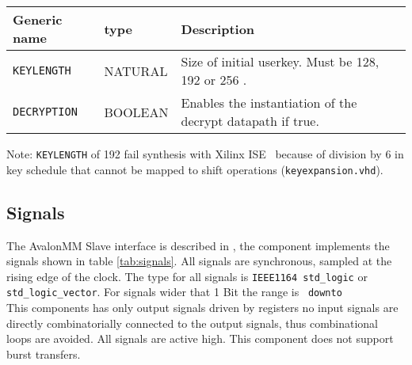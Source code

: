 \documentclass{ruschidoc}
\begin{document}
\begin{tabularx}{\textwidth}{|p{33mm}|p{25mm}|X|}
  \hline
  \bf{Generic name} & \bf{type} & \bf{Description}\\ \hline
  \texttt{KEYLENGTH}  \label{gen:keylength}	& NATURAL   & Size of initial userkey. Must be 128, 192 or 256 \footnotemark[1] . \\ \hline
  \texttt{DECRYPTION} \label{gen:decryption}  & BOOLEAN  & Enables the instantiation of the decrypt datapath if true. \\
\hline
\end{tabularx}
\label{tab:generics}
Note: \texttt{KEYLENGTH} of 192 fail synthesis with Xilinx ISE \rtm\ because of division by 6 in key schedule that cannot be mapped to shift operations (\texttt{keyexpansion.vhd}).

\subsection{Signals}
\label{sec:signals}
The Avalon\rtm\-MM Slave interface is described in \cite{Altera:Avalon}, the component
implements the signals shown in table \ref{tab:signals}. All signals are synchronous,
sampled at the rising edge of the clock. The type for all signals is \texttt{IEEE1164
    std\_logic} or \texttt{std\_logic\_vector}. For signals wider that 1 Bit the range
is \MSB\ \texttt{downto} \LSB\. \\
This components has only output signals driven by registers no input signals are directly combinatorially connected to the
output signals, thus combinational loops are avoided.  All signals are active
high. This component does not support burst transfers.
\end{document}
